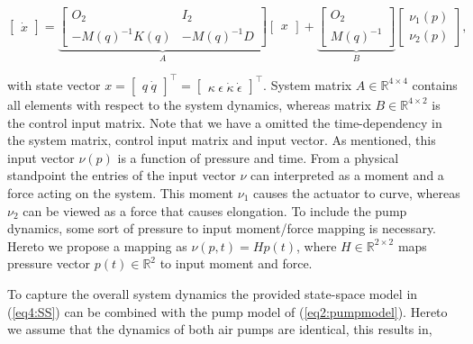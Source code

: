 \begin{equation}
     \begin{bmatrix} \dot{x}  \end{bmatrix}   = \underbrace{  \begin{bmatrix} O_{2} & I_{2} \\ -M(q)^{-1}K(q)  & -M(q)^{-1} D \end{bmatrix}   }_{A} \begin{bmatrix} x \end{bmatrix}  +      \underbrace{\begin{bmatrix} O_{2} \\ M(q)^{-1}   \end{bmatrix}   }_{B}    \begin{bmatrix} \nu_1(p) \\ \nu_2(p)  
     \end{bmatrix}, 
     \label{eq4:SS}
\end{equation}

with state vector $x = \begin{bmatrix} q \hspace{3pt} \dot{q}   \end{bmatrix}^\top =  \begin{bmatrix} \kappa \hspace{3pt} \epsilon \hspace{3pt} \dot{\kappa}  \hspace{3pt} \dot{\epsilon}  \end{bmatrix}^{\top}$. System matrix $A \in \mathbb{R}^{4\times 4}$ contains all elements with respect to the system dynamics, whereas matrix $B\in\mathbb{R}^{4 \times 2}$ is the control input matrix. Note that we have a omitted the time-dependency in the system matrix, control input matrix and input vector. As mentioned, this input vector $\nu(p)$ is a function of pressure and time. From a physical standpoint the entries of the input vector $\nu$ can interpreted as a moment and a force acting on the system. This moment $\nu_1$ causes the actuator to curve, whereas $\nu_2$ can be viewed as a force that causes elongation. To include the pump dynamics, some sort of pressure to input moment/force mapping is necessary. Hereto we propose a mapping as $\nu(p,t) = H p(t)$, where $H \in \mathbb{R}^{2\times 2}$ maps pressure vector $p(t) \in \mathbb{R}^2$ to input moment and force. 

To capture the overall system dynamics the provided state-space model in (\ref{eq4:SS}) can be combined with the pump model of (\ref{eq2:pumpmodel}). Hereto we assume that the dynamics of both air pumps are identical, this results in, 

